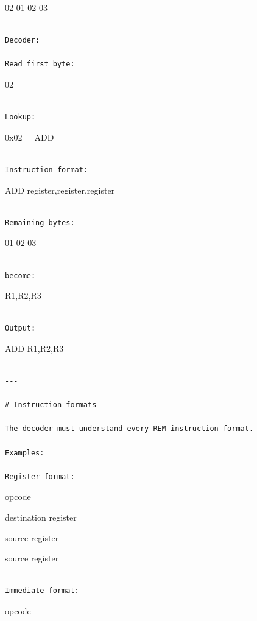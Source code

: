 \documentclass[
  oneside,
  openany]{book}
\begin{document}
02 01 02 03

\begin{verbatim}

Decoder:

Read first byte:
\end{verbatim}

02

\begin{verbatim}

Lookup:
\end{verbatim}

0x02 = ADD

\begin{verbatim}

Instruction format:
\end{verbatim}

ADD register,register,register

\begin{verbatim}

Remaining bytes:
\end{verbatim}

01 02 03

\begin{verbatim}

become:
\end{verbatim}

R1,R2,R3

\begin{verbatim}

Output:
\end{verbatim}

ADD R1,R2,R3

\begin{verbatim}

---

# Instruction formats

The decoder must understand every REM instruction format.

Examples:

Register format:
\end{verbatim}

opcode

destination register

source register

source register

\begin{verbatim}

Immediate format:
\end{verbatim}

opcode
\end{document}
